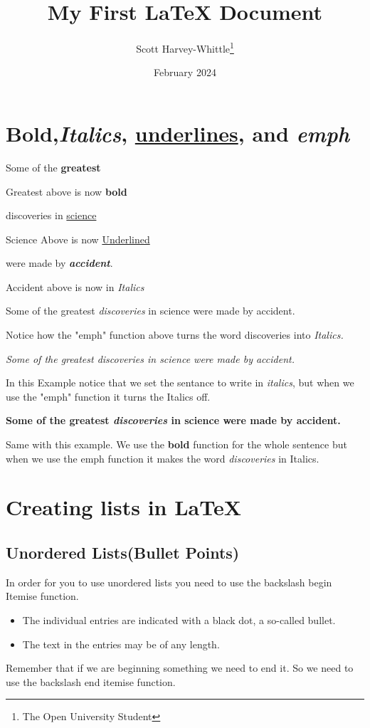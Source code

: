 \documentclass[12pt,a4paper,landscape]{article}
\title{My First \LaTeX{} Document}
\author{Scott Harvey-Whittle\thanks {The Open University Student}}
\date{February 2024}
\begin{document}
\maketitle
\begin{flushleft}
    

\section{\textbf{Bold},\textit{Italics}, \underline{underlines}, and \emph{emph}}
Some of the \textbf{greatest}

Greatest above is now \textbf{bold} 

discoveries in \underline{science} 

Science Above is now \underline{Underlined}

were made by \textbf{\textit{accident}}.

Accident above is now in \textit{Italics}


Some of the greatest \emph{discoveries} in science 
were made by accident.

Notice how the "emph" function above turns the word discoveries into  \emph{Italics.}

\textit{Some of the greatest \emph{discoveries} 
in science were made by accident.}

In this Example notice that we set the sentance to write in \textit{italics}, but when we use the "emph" function it turns the Italics off. 

\textbf{Some of the greatest \emph{discoveries} 
in science were made by accident.}

Same with this example. We use the \textbf{bold} function for the whole sentence but when we use the emph function it makes the word \textit{discoveries} in Italics.

\section{Creating lists in \LaTeX{}}

\subsection{Unordered Lists(Bullet Points)}

In order for you to use unordered lists you need to use the backslash begin Itemise function.

\begin{itemize}
  \item The individual entries are indicated with a black dot, a so-called bullet.
  \item The text in the entries may be of any length.
\end{itemize}
Remember that if we are beginning something we need to end it. So we need to use the backslash end itemise function. 


\end{flushleft}
\end{document}
